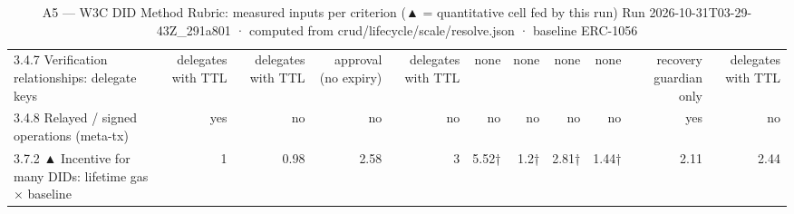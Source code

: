 \begin{table}[ht]
\begin{tabular}{lrrrrrrrrrr}
3.4.7 Verification relationships: delegate keys & delegates with TTL & delegates with TTL & approval (no expiry) & delegates with TTL & none & none & none & none & recovery guardian only & delegates with TTL \\
3.4.8 Relayed / signed operations (meta-tx) & yes & no & no & no & no & no & no & no & yes & no \\
3.7.2 ▲ Incentive for many DIDs: lifetime gas × baseline & 1 & 0.98 & 2.58 & 3 & 5.52† & 1.2† & 2.81† & 1.44† & 2.11 & 2.44 \\
\bottomrule
\end{tabular}
\caption{A5 — W3C DID Method Rubric: measured inputs per criterion (▲ = quantitative cell fed by this run) Run 2026-10-31T03-29-43Z\_291a801 · computed from crud/lifecycle/scale/resolve.json · baseline ERC-1056}
\label{tab:analysis_rubric_inputs}
\end{table}
